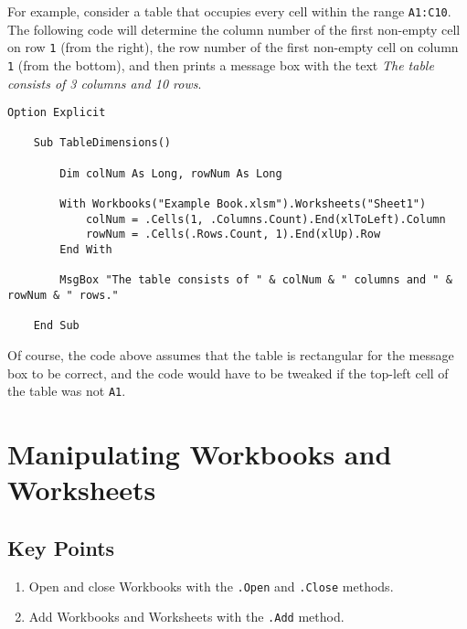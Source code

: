 \documentclass[11pt]{article}%
\begin{document}
For example, consider a table that occupies every cell within the range \texttt{A1:C10}. The following code will determine the column number of the first non-empty cell on row \texttt{1} (from the right), the row number of the first non-empty cell on column \texttt{1} (from the bottom), and then prints a message box with the text \textit{The table consists of 3 columns and 10 rows}.\\

\begin{lstlisting}[style=A]
    Option Explicit

    Sub TableDimensions()

        Dim colNum As Long, rowNum As Long

        With Workbooks("Example Book.xlsm").Worksheets("Sheet1")
            colNum = .Cells(1, .Columns.Count).End(xlToLeft).Column
            rowNum = .Cells(.Rows.Count, 1).End(xlUp).Row
        End With

        MsgBox "The table consists of " & colNum & " columns and " & rowNum & " rows."

    End Sub
\end{lstlisting}

Of course, the code above assumes that the table is rectangular for the message box to be correct, and the code would have to be tweaked if the top-left cell of the table was not \texttt{A1}.


\section{Manipulating Workbooks and Worksheets}


\subsection{Key Points}

\begin{enumerate}
    \item Open and close Workbooks with the \texttt{.Open} and \texttt{.Close} methods.
    \item Add Workbooks and Worksheets with the \texttt{.Add} method.
\end{enumerate}
\end{document}

